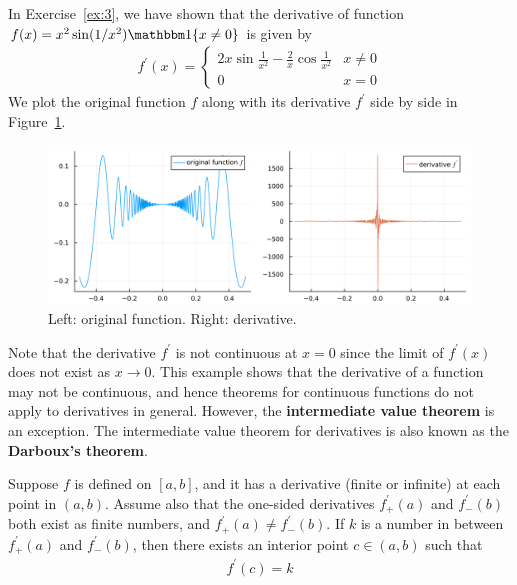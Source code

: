 \documentclass[thmcnt=section, 12pt]{my-elegantbook}
\begin{document}
\par In Exercise~\ref{ex:3}, we have shown that the derivative of function $f(x) = x^2 \sin(1/x^2) \ind\{x \neq 0\}$ is given by 
\begin{align*}
    f^\prime(x) = \begin{cases}
        2x \sin \frac{1}{x^2} 
        - \frac{2}{x} \cos \frac{1}{x^2}
        & x \neq 0 \\
        0 & x = 0
    \end{cases}
\end{align*}
We plot the original function $f$ along with its derivative $f^\prime$ side by side in Figure~\ref{fig:4}.
\begin{figure}[ht]
    \centering
    \includegraphics[scale=0.2]{figures/graph-004.png}
    \caption{Left: original function. Right: derivative.}
    \label{fig:4}
\end{figure}

\noindent Note that the derivative $f^\prime$ is not continuous at $x = 0$ since the limit of $f^\prime(x)$ does not exist as $x \to 0$. This example shows that the derivative of a function may not be continuous, and hence theorems for continuous functions do not apply to derivatives in general. However, the \textbf{intermediate value theorem} is an exception. The intermediate value theorem for derivatives is also known as the \textbf{Darboux's theorem}.

\begin{theorem}[Darboux] \label{thm:12}
    Suppose $f$ is defined on $[a, b]$, and it has a derivative (finite or infinite) at each point in $(a, b)$. Assume also that the one-sided derivatives $f^\prime_{+}(a)$ and $f^\prime_{-}(b)$ both exist as finite numbers, and $f^\prime_{+}(a) \neq f^\prime_{-}(b)$. If $k$ is a number in between $f^\prime_{+}(a)$ and $f^\prime_{-}(b)$, then there exists an interior point $c \in (a, b)$ such that 
    \begin{align*}
        f^\prime(c) = k
    \end{align*}
\end{theorem}
\end{document}

